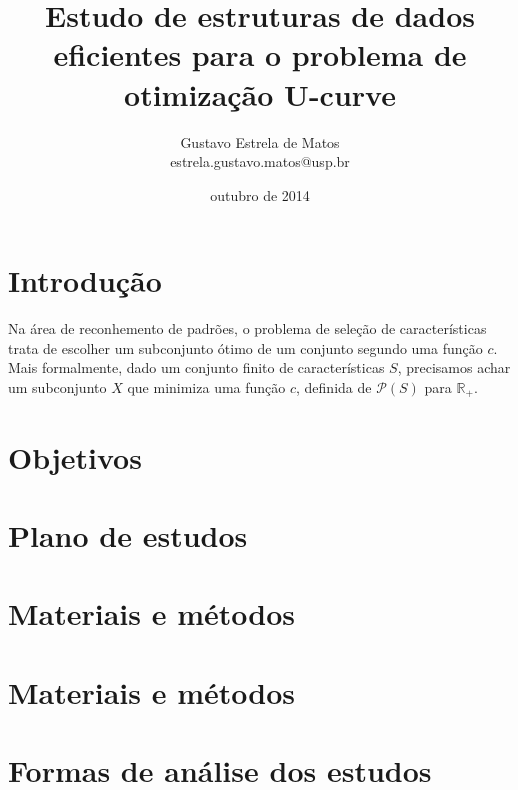 \documentclass[12pt]{article}
\begin{document}
\title{Estudo de estruturas de dados eficientes para o problema de otimização U-curve} %
\author{Gustavo Estrela de Matos \\ estrela.gustavo.matos@usp.br} %
\date{outubro de 2014} %

\maketitle %

\def \negritovi {\textbf} %

\tableofcontents %
\pagebreak %

\section{Introdu\c{c}\~ao} %

Na área de reconhemento de padrões, o problema de seleção de características trata de escolher um subconjunto ótimo de um conjunto segundo uma função \begin{math}c\end{math}. Mais formalmente, dado um conjunto finito de características 
\begin{math}S\end{math}, precisamos achar um subconjunto \begin{math}X\end{math} que minimiza uma função \begin{math}c\end{math}, definida de $\mathcal{P}$\begin{math}(S)\end{math} para $\mathbb{R_+}$.

\section{Objetivos}

\section{Plano de estudos}

\section{Materiais e m\'etodos}

\section{Materiais e m\'etodos}

\section{Formas de an\'alise dos estudos}
\end{document}
